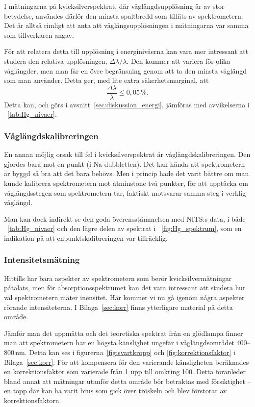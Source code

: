 \documentclass[11pt,a4paper]{article}
\newcommand{\figref}{\figurename~\ref}
\newcommand{\tabref}{\tablename~\ref} %
\begin{document}
I mätningarna på kvicksilverspektrat, där våglängdsupplösning är av
stor betydelse, användes därför den minsta spaltbredd som tilläts av
spektrometern. Det är alltså rimligt att anta att våglängsupplösningen
i mätningarna var samma som tillverkaren angav.

För att relatera detta till upplösning i energinivåerna\footnotemark{}
kan vara mer intressant att studera den relativa upplösningen,
$\Delta\lambda/\lambda$. Den kommer att variera för olika våglängder,
men man får en övre begränsning genom att ta den minsta våglängd som
man använder. Detta ger, med lite extra säkerhetsmarginal, att 
\[ 
\frac{\Delta\lambda}{\lambda}\le 0,05\,\%. 
\]
Detta kan, och görs i avsnitt~\ref{sec:diskussion_energi}, jämföras
med avvikelserna i \tabref{tab:Hg_nivaer}.


\subsubsection{Våglängdskalibreringen}
En annan möjlig orsak till fel i kvicksilverspektrat är
våglängdskalibreringen. Den gjordes bara mot en punkt
(i Na-dubbletten). Det kan hända att spektrometern är byggd så bra att
det bara behövs. Men i princip hade det varit bättre om man kunde
kalibrera spektrometern mot åtminstone två punkter, för att upptäcka
om våglängdsstegen som spektrometern tar, faktiskt motsvarar samma
steg i verklig våglängd. 

Man kan dock indirekt se den goda överensstämmelsen med NITS:s data, i
både \tabref{tab:Hg_nivaer} och den lägre delen av spektrat i
\figref{fig:Hg_spektrum}, som en indikation på att enpunktskalibreringen
var tillräcklig.  

\subsubsection{Intensitetsmätning} 
Hittills har bara aspekter av spektrometern som berör
kvicksilvermätningar påtalats, men för absorptionsspektrumet kan det
vara intressant att studera hur väl spektrometern mäter inensitet. Här
kommer vi nu gå igenom några aspekter rörande intensiteterna. I
Bilaga~\ref{sec:korr} finns ytterligare material på detta område. 

Jämför man det uppmätta och det teoretiska spektrat
från en glödlampa finner man att spektrometern har en högsta
känslighet ungefär i våglängdsområdet 400--800\,nm. Detta kan ses i
figurerna~\ref{fig:svartkropp} och \ref{fig:korrektionsfaktor} i
Bilaga~\ref{sec:korr}. För att kompensera för den varierande
känsligheten beräknades en korrektionsfaktor som varierade från 1 upp
till omkring 100.
Detta föranleder bland annat att mätningar
utanför detta område bör betraktas med försiktighet -- en topp där kan
ha varit brus som gick över tröskeln och blev förstorat av
korrektionsfaktorn. 
\end{document}
